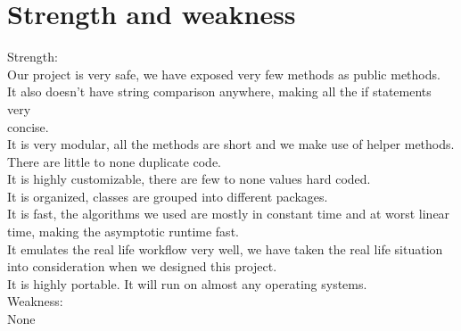 \documentclass[12pt]{article}
\begin{document}
\section*{Strength and weakness}
Strength:\\
Our project is very safe, we have exposed very few methods as public methods.\\
It also doesn't have string comparison anywhere, making all the if statements very \\concise.\\
It is very modular, all the methods are short and we make use of helper methods.\\
There are little to none duplicate code.\\
It is highly customizable, there are few to none values hard coded.\\
It is organized, classes are grouped into different packages.\\
It is fast, the algorithms we used are mostly in constant time and at worst linear time, making the asymptotic runtime fast.\\ 
It emulates the real life workflow very well, we have taken the real life situation into consideration when we designed this project.\\
It is highly portable. It will run on almost any operating systems. 
\hfill\\
Weakness:\\
None
\end{document}
